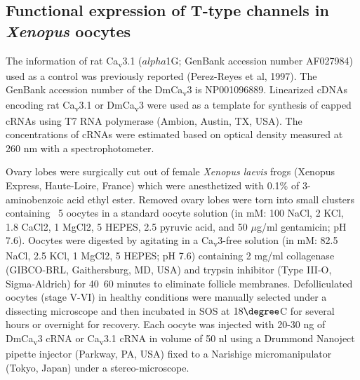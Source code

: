 \subsection*{Functional expression of T-type channels in \emph{Xenopus} oocytes}

The information of rat Ca\textsubscript{v}3.1 ($alpha$1G; GenBank accession number AF027984) used as a control was previously reported (Perez-Reyes et al, 1997).
The GenBank accession number of the DmCa\textsubscript{v}3 is NP001096889.
Linearized cDNAs encoding rat Ca\textsubscript{v}3.1 or DmCa\textsubscript{v}3 were used as a template for synthesis of capped cRNAs using T7 RNA polymerase (Ambion, Austin, TX, USA).
The concentrations of cRNAs were estimated based on optical density measured at 260 nm with a spectrophotometer.

Ovary lobes were surgically cut out of female \emph{Xenopus laevis} frogs (Xenopus Express, Haute-Loire, France) which were anesthetized with 0.1\% of 3-aminobenzoic acid ethyl ester.
Removed ovary lobes were torn into small clusters containing ~5 oocytes in a standard oocyte solution (in mM: 100 NaCl, 2 KCl, 1.8 CaCl2, 1 MgCl2, 5 HEPES, 2.5 pyruvic acid, and 50 $\mu$g/ml gentamicin; pH 7.6).
Oocytes were digested by agitating in a Ca\textsubscript{v}3-free solution (in mM: 82.5 NaCl, 2.5 KCl, 1 MgCl2, 5 HEPES; pH 7.6) containing 2 mg/ml collagenase (GIBCO-BRL, Gaithersburg, MD, USA) and trypsin inhibitor (Type III-O, Sigma-Aldrich) for 40~60 minutes to eliminate follicle membranes.
Defolliculated oocytes (stage V-VI) in healthy conditions were manually selected under a dissecting microscope and then incubated in SOS at $18\degree$C for several hours or overnight for recovery.
Each oocyte was injected with 20-30 ng of DmCa\textsubscript{v}3 cRNA or Ca\textsubscript{v}3.1 cRNA in volume of 50 nl using a Drummond Nanoject pipette injector (Parkway, PA, USA) fixed to a Narishige micromanipulator (Tokyo, Japan) under a stereo-microscope.